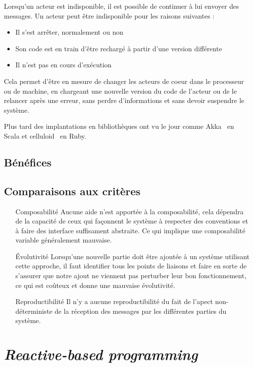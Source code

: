 \documentclass{article}
\begin{document}
Lorsqu'un acteur est indisponible, il est possible de continuer à lui envoyer
des messages.
Un acteur peut être indisponible pour les raisons suivantes :
\begin{itemize}
    \item Il s'est arrêter, normalement ou non
    \item Son code est en train d'être rechargé à partir d'une version différente
    \item Il n'est pas en cours d'exécution
\end{itemize}

Cela permet d'être en mesure de changer les acteurs de coeur dans le processeur ou
de machine, en chargeant une nouvelle version du code de l'acteur ou de le relancer
après une erreur, sans perdre d'informations et sans devoir suspendre le système.

Plus tard des implantations en bibliothèques ont vu le jour comme Akka~\cite{akka}
en Scala et celluloid~\cite{celluloid} en Ruby.

\subsection{Bénéfices}\label{bénéfices}

\subsection{Comparaisons aux critères}
\begin{itemize}
    \item[Composabilité] Aucune aide n'est apportée à la composabilité, cela dépendra
de la capacité de ceux qui façonnent le système à respecter des conventions et à
faire des interface suffisament abstraite. Ce qui implique une composabilité variable
généralement mauvaise.
    \item[Évolutivité] Lorsqu'une nouvelle partie doit être ajoutée à un système
utilisant cette approche, il faut identifier tous les points de liaisons et faire
en sorte de s'assurer que notre ajout ne viennent pas perturber leur bon fonctionnement,
ce qui est coûteux et donne une mauvaise évolutivité.
    \item[Reproductibilité] Il n'y a aucune reproductibilité du fait de l'apect
non-déterministe de la réception des messages par les différentes parties du système.
\end{itemize}


\section{\emph{Reactive-based programming}}\label{reactive}
\end{document}
